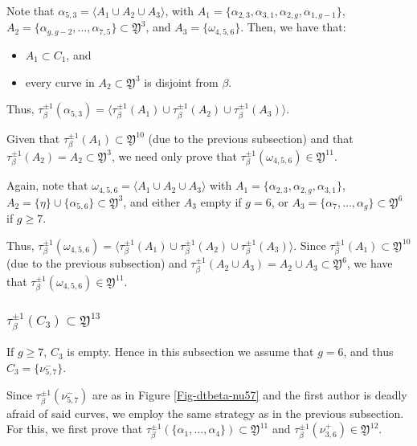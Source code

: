 \documentclass{artv3}
\newcommand*{\Y}{\mathfrak{Y}}
\begin{document}
Note that $\alpha_{5,3} = \langle A_{1} \cup A_{2} \cup A_{3} \rangle$, with $A_{1} = \{\alpha_{2,3}, \alpha_{3,1}, \alpha_{2,g}, \alpha_{1,g-1}\}$, $A_{2} = \{\alpha_{g, g-2}, \ldots, \alpha_{7,5}\} \subset \Y^3$, and $A_3 = \{\omega_{4,5,6}\}$. Then, we have that:
\begin{itemize}
    \item $A_{1} \subset C_1$, and
    \item every curve in $A_{2} \subset \Y^3$ is disjoint from $\beta$.
\end{itemize}

Thus, $\tau_{\beta}^{\pm 1} (\alpha_{5,3}) = \langle \tau_{\beta}^{\pm 1}(A_{1}) \cup \tau_{\beta}^{\pm 1}(A_{2}) \cup \tau_{\beta}^{\pm 1}(A_{3})\rangle$.

Given that $\tau_{\beta}^{\pm 1}(A_1) \subset \Y^{10}$ (due to the previous subsection) and that $\tau_{\beta}^{\pm 1}(A_2) = A_2 \subset \Y^3$, we need only prove that $\tau_{\beta}^{\pm 1}(\omega_{4,5,6}) \in \Y^{11}$.

Again, note that $\omega_{4,5,6} = \langle A_{1} \cup A_{2} \cup A_{3} \rangle$ with $A_{1} = \{\alpha_{2,3}, \alpha_{2,g}, \alpha_{3,1}\}$, $A_{2} = \{\eta\} \cup \{\alpha_{5,6}\} \subset \Y^3$, and either $A_{3}$ empty if $g = 6$, or $A_{3} = \{\alpha_{7}, \ldots, \alpha_{g}\} \subset \Y^6$ if $g \geq 7$.

Thus, $\tau_{\beta}^{\pm 1}(\omega_{4,5,6}) = \langle \tau_{\beta}^{\pm 1}(A_{1}) \cup \tau_{\beta}^{\pm 1}(A_{2}) \cup \tau_{\beta}^{\pm 1} (A_{3})\rangle$. Since $\tau_{\beta}^{\pm 1}(A_{1}) \subset \Y^{10}$ (due to the previous subsection) and $\tau_{\beta}^{\pm 1}(A_{2} \cup A_{3}) = A_2 \cup A_3 \subset \Y^6$, we have that $\tau_{\beta}^{\pm 1}(\omega_{4,5,6}) \in \Y^{11}$.

\subsubsection{$\tau_{\beta}^{\pm 1}(C_3) \subset \Y^{13}$}\label{subsubsec:taubetaC3}

If $g \geq 7$, $C_{3}$ is empty. Hence in this subsection we assume that $g = 6$, and thus $C_{3} = \{\nu_{5,7}^{-}\}$.

Since $\tau_{\beta}^{\pm 1}(\nu_{5,7}^{-})$ are as in Figure \ref{Fig-dtbeta-nu57} and the first author is deadly afraid of said curves, we employ the same strategy as in the previous subsection. For this, we first prove that $\tau_{\beta}^{\pm 1}(\{\alpha_{1}, \ldots, \alpha_{4}\}) \subset \Y^{11}$ and $\tau_{\beta}^{\pm 1}(\nu_{3,6}^{+}) \in \Y^{12}$.
\end{document}
